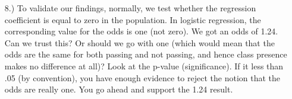 ﻿\documentclass[a4paper,12pt]{article}
\begin{document}
\begin{itemize}
	\item[8.)] To validate our findings, normally, we test whether the regression coefficient is equal to zero in the population.
	In logistic regression, the corresponding value for the odds is one (not zero). We got an odds of 1.24.
	Can we trust this? Or should we go with one (which would mean that the odds are the same for both passing and not passing,
	and hence class presence makes no difference at all)?  Look at the p-value (significance). If it less than .05 (by convention), you have enough evidence to reject
	the notion that the odds are really one. You go ahead and support the 1.24 result.
\end{itemize}
\end{document}
